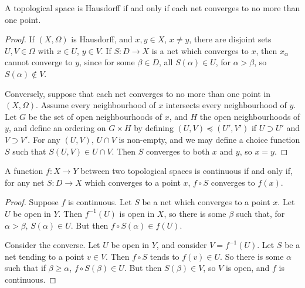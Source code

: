 \begin{theorem}
    A topological space is Hausdorff if and only if each net converges to no more than one point.
\end{theorem}
\begin{proof}
    If $(X,\Omega)$ is Hausdorff, and $x,y \in X$, $x \neq y$, there are disjoint sets $U,V \in \Omega$ with $x \in U$, $y \in V$. If $S: D \to X$ is a net which converges to $x$, then $x_\alpha$ cannot converge to $y$, since for some $\beta \in D$, all $S(\alpha) \in U$, for $\alpha > \beta$, so $S(\alpha) \not \in V$.

    Conversely, suppose that each net converges to no more than one point in $(X, \Omega)$. Assume every neighbourhood of $x$ intersects every neighbourhood of $y$. Let $G$ be the set of open neighbourhoods of $x$, and $H$ the open neighbourhoods of $y$, and define an ordering on $G \times H$ by defining $(U,V) \preceq (U',V')$ if $U \supset U'$ and $V \supset V'$. For any $(U,V)$, $U \cap V$ is non-empty, and we may define a choice function $S$ such that $S(U,V) \in U \cap V$. Then $S$ converges to both $x$ and $y$, so $x = y$.
\end{proof}

\begin{theorem}
    A function $f:X \to Y$ between two topological spaces is continuous if and only if, for any net $S:D \to X$ which converges to a point $x$, $f \circ S$ converges to $f(x)$.
\end{theorem}
\begin{proof}
    Suppose $f$ is continuous. Let $S$ be a net which converges to a point $x$. Let $U$ be open in $Y$. Then $f^{-1}(U)$ is open in $X$, so there is some $\beta$ such that, for $\alpha > \beta$, $S(\alpha) \in U$. But then $f \circ S (\alpha) \in f(U)$.

    Consider the converse. Let $U$ be open in $Y$, and consider $V = f^{-1}(U)$. Let $S$ be a net tending to a point $v \in V$. Then $f \circ S$ tends to $f(v) \in U$. So there is some $\alpha$ such that if $\beta \geq \alpha$, $f \circ S (\beta) \in U$. But then $S(\beta) \in V$, so $V$ is open, and $f$ is continuous.
\end{proof}


